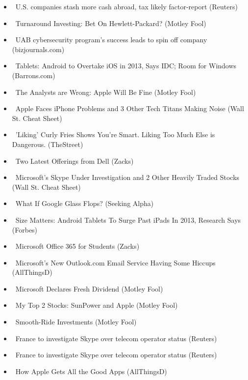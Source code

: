 \documentclass[11pt,asymmetric]{article}
\begin{document}
\begin{itemize}
\item\ U.S. companies stash more cash abroad, tax likely factor-report (Reuters)
\item\ Turnaround Investing: Bet On Hewlett-Packard? (Motley Fool)
\item\ UAB cybersecurity program's success leads to spin off company (bizjournals.com)
\item\ Tablets: Android to Overtake iOS in 2013, Says IDC; Room for Windows (Barrons.com)
\item\ The Analysts are Wrong: Apple Will Be Fine (Motley Fool)
\item\ Apple Faces iPhone Problems and 3 Other Tech Titans Making Noise (Wall St. Cheat Sheet)
\item\ 'Liking' Curly Fries Shows You're Smart. Liking Too Much Else is Dangerous. (TheStreet)
\item\ Two Latest Offerings from Dell (Zacks)
\item\ Microsoft’s Skype Under Investigation and 2 Other Heavily Traded Stocks (Wall St. Cheat Sheet)
\item\ What If Google Glass Flops? (Seeking Alpha)
\item\ Size Matters: Android Tablets To Surge Past iPads In 2013, Research Says (Forbes)
\item\ Microsoft Office 365 for Students (Zacks)
\item\ Microsoft's New Outlook.com Email Service Having Some Hiccups (AllThingsD)
\item\ Microsoft Declares Fresh Dividend (Motley Fool)
\item\ My Top 2 Stocks: SunPower and Apple (Motley Fool)
\item\ Smooth-Ride Investments (Motley Fool)
\item\ France to investigate Skype over telecom operator status (Reuters)
\item\ France to investigate Skype over telecom operator status (Reuters)
\item\ How Apple Gets All the Good Apps (AllThingsD)
\end{itemize}
\end{document}
